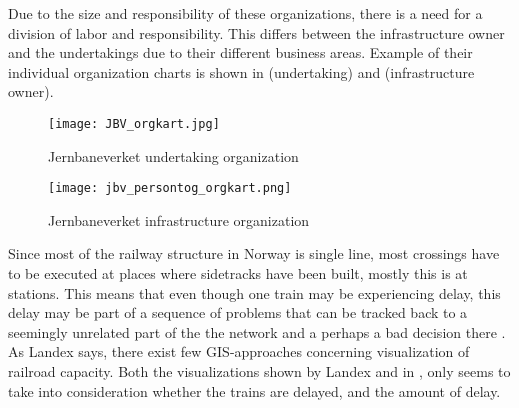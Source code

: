 Due to the size and responsibility of these organizations, there is a need for 
a division of labor and responsibility. This differs between the 
infrastructure owner and the undertakings due to their different business 
areas. Example of their individual organization charts is shown in  (undertaking) and  (infrastructure owner).

\begin{figure}[!htbp]
	\texttt{[image: JBV\_orgkart.jpg]}
	\caption[Jernbaneverket undertaking organization]{Jernbaneverket undertaking organization \cite{sintefPresis}}
	\label{fig:jbv_undertaking_org_map}
\end{figure}

\begin{figure}[!htbp]
	\texttt{[image: jbv\_persontog\_orgkart.png]}
	\caption[Jernbaneverket infrastructure organization]{Jernbaneverket infrastructure organization \cite{jernbaneverketOrganisasjon}}
	\label{fig:jbv_infrastructure_org_map}
\end{figure}

Since most of the railway structure in Norway is single line, most crossings
have to be executed at places where sidetracks have been built, mostly this is
at stations. This means that even though one train may be experiencing delay, 
this delay may be part of a sequence of problems that can be tracked back to a 
seemingly unrelated part of the the network and a perhaps a bad decision there 
\cite{cule2011mining}.
\\

As Landex\cite{landex2009gis} says, there exist few GIS-approaches concerning
visualization of railroad capacity. Both the visualizations shown by Landex and
in  , 
only seems to take into consideration whether
the trains are delayed, and the amount of delay. \\

